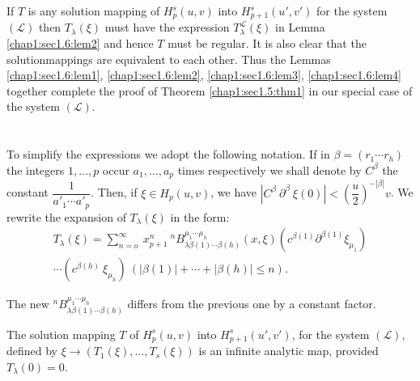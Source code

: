 If $T$ is any solution mapping of $H^s_{p}(u, v)$ into $H^s_{p+1}(u',
v')$ for the system $(\mathscr{L})$ then $T_\lambda(\xi)$ must have
the expression $T^{\mathscr{L}}_\lambda (\xi)$ in Lemma \ref{chap1:sec1.6:lem2} and hence
$T$ must be regular. It is also clear that the solution\pageoriginale mappings are
equivalent to each other. Thus the Lemmas \ref{chap1:sec1.6:lem1},
\ref{chap1:sec1.6:lem2}, \ref{chap1:sec1.6:lem3},
\ref{chap1:sec1.6:lem4}  together 
complete the proof of Theorem \ref{chap1:sec1.5:thm1} in our special
case of the system $(\mathscr{L})$. 

\section{}\label{chap1:sec1.7} %

To simplify the expressions we adopt the following notation. If in
$\beta = (r_1 \cdots r_h)$ the integers $1,  \ldots,  p$ occur $a_1,
\ldots,  a_p$ times respectively we shall denote by $C^\beta$ the
constant $\dfrac{1}{a'_1 \cdots a'_p}$. Then,  if $\xi \in H_p(u, v)$,
we have $| C^\beta ~ \partial^\beta ~ \xi (0) | <
\left(\dfrac{u}{2}\right)^{-|\beta |} v$. We rewrite the expansion of
$T_\lambda (\xi)$ in the form: 
\begin{multline*}
  T_\lambda (\xi) = \sum_{n=o}^\infty ~ x^n_{p+1} ~ {}^n B^{\mu_1 \cdots
    \mu_h}_{\lambda\beta(1) \cdots \beta(h)} (x, \xi)
  \left(c^{\beta(1)}\partial^{\beta(1)} \xi_{\mu_1}\right)\\ 
  \cdots \left(c^{\beta(h)}
  ~\xi_{\mu_h}\right) ~(| \beta (1) | + \cdots + | \beta (h) | \le n). 
\end{multline*}

The new $ ^nB^{\mu_1 \cdots \mu_h}_{\lambda\beta(1) \cdots \beta(h)}$
differs from the previous one by a constant factor. 

\begin{lemma}\label{chap1:sec1.7:lem5}%
  The solution mapping $T$ of $H^s_p(u, v)$ into $H^s_{p+1} (u', v')$,
  for the system $(\mathscr{L})$,  defined by $\xi \rightarrow (T_1
  (\xi),  \ldots,  T_s(\xi))$ is an infinite analytic map,  provided
  $T_\lambda (0) = 0$. 
\end{lemma}

